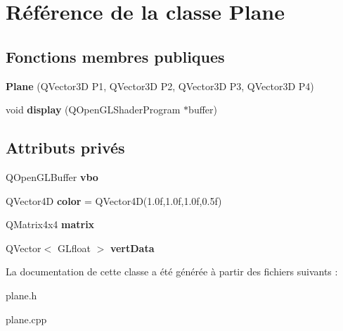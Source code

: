 \hypertarget{classPlane}{}\section{Référence de la classe Plane}
\label{classPlane}
\subsection*{Fonctions membres publiques}
\begin{DoxyCompactItemize}
\item 
\mbox{\label{classPlane_af9f3ac88c6ab501a8505cdcaf86f6006}} 
{\bfseries Plane} (Q\+Vector3D P1, Q\+Vector3D P2, Q\+Vector3D P3, Q\+Vector3D P4)
\item 
\mbox{\label{classPlane_a6a32e4e53a65f653db1db5d0ad4f091e}} 
void {\bfseries display} (Q\+Open\+G\+L\+Shader\+Program $\ast$buffer)
\end{DoxyCompactItemize}
\subsection*{Attributs privés}
\begin{DoxyCompactItemize}
\item 
\mbox{\label{classPlane_a3c04d57db234c7c398c7b9a338cf5cd1}} 
Q\+Open\+G\+L\+Buffer {\bfseries vbo}
\item 
\mbox{\label{classPlane_a954a73cc7db94dfd6135b0186dbdc181}} 
Q\+Vector4D {\bfseries color} = Q\+Vector4D(1.\+0f,1.\+0f,1.\+0f,0.\+5f)
\item 
\mbox{\label{classPlane_a8d2c0202c6b75229c990c94f70766009}} 
Q\+Matrix4x4 {\bfseries matrix}
\item 
\mbox{\label{classPlane_a49cb2f877ff57983b0c443a09b144af4}} 
Q\+Vector$<$ G\+Lfloat $>$ {\bfseries vert\+Data}
\end{DoxyCompactItemize}


La documentation de cette classe a été générée à partir des fichiers suivants \+:\begin{DoxyCompactItemize}
\item 
plane.\+h\item 
plane.\+cpp\end{DoxyCompactItemize}
